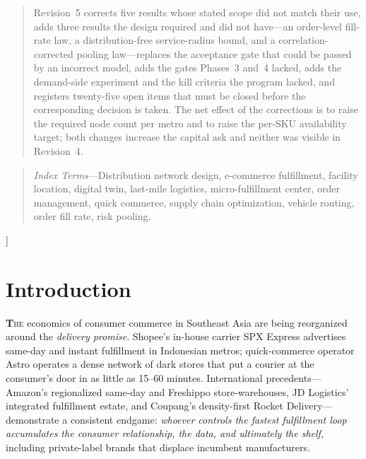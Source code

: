 \documentclass[10pt,twocolumn,letterpaper]{article}
\newcommand{\IEEEPARstart}[2]{\lettrine[lines=2,findent=2pt,nindent=0pt]{\textbf{#1}}{#2}}
\theoremstyle{definition}
\begin{document}
\begin{@twocolumnfalse}
\begin{quotation}
Revision~5 corrects five results whose stated scope did not match their use, adds three results the design required and did not have---an order-level fill-rate law, a distribution-free service-radius bound, and a correlation-corrected pooling law---replaces the acceptance gate that could be passed by an incorrect model, adds the gates Phases~3 and~4 lacked, adds the demand-side experiment and the kill criteria the program lacked, and registers twenty-five open items that must be closed before the corresponding decision is taken. The net effect of the corrections is to raise the required node count per metro and to raise the per-SKU availability target; both changes increase the capital ask and neither was visible in Revision~4.
\end{quotation}
\begin{quotation}\noindent\footnotesize
\textit{Index Terms}---Distribution network design, e-commerce fulfillment, facility location, digital twin, last-mile logistics, micro-fulfillment center, order management, quick commerce, supply chain optimization, vehicle routing, order fill rate, risk pooling.
\end{quotation}
\vspace{10pt}
\end{@twocolumnfalse}
]

\renewcommand{\thefootnote}{\fnsymbol{footnote}}
\renewcommand{\thefootnote}{\arabic{footnote}}






\section{Introduction}

\IEEEPARstart{T}{he} economics of consumer commerce in Southeast Asia are being reorganized around the \emph{delivery promise}. Shopee's in-house carrier SPX Express advertises same-day and instant fulfillment in Indonesian metros; quick-commerce operator Astro operates a dense network of dark stores that put a courier at the consumer's door in as little as 15--60 minutes. International precedents---Amazon's regionalized same-day and Freshippo store-warehouses, JD Logistics' integrated fulfillment estate, and Coupang's density-first Rocket Delivery---demonstrate a consistent endgame: \emph{whoever controls the fastest fulfillment loop accumulates the consumer relationship, the data, and ultimately the shelf}, including private-label brands that displace incumbent manufacturers.
\end{document}
